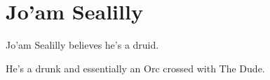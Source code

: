 \section{Jo'am Sealilly}\label{sec:jo'amSealilly}
   \medskip

Jo'am Sealilly believes he's a druid.

He's a drunk and essentially an Orc crossed with The Dude.
